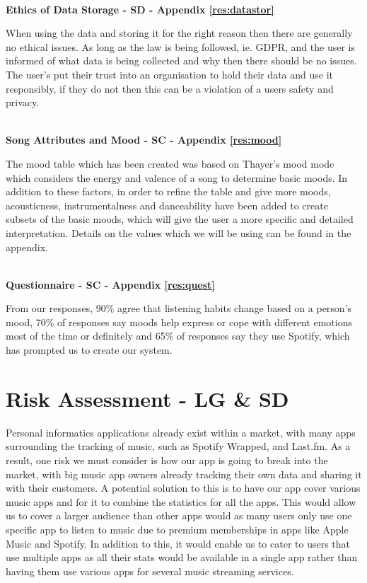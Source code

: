 \documentclass[10pt, notitlepage]{report}
\begin{document}
\leavevmode \\
\textbf{Ethics of Data Storage - SD - Appendix \ref{res:datastor}}

When using the data and storing it for the right reason then there are generally no ethical issues. As long as the law is being followed, ie. GDPR, and the user is informed of what data is being collected and why then there should be no issues. The user's put their trust into an organisation to hold their data and use it responsibly, if they do not then this can be a violation of a users safety and privacy.

\leavevmode \\
\textbf{Song Attributes and Mood - SC - Appendix \ref{res:mood}}

The mood table which has been created was based on Thayer’s mood mode which considers the energy and valence of a song to determine basic moods. In addition to these factors, in order to refine the table and give more moods, acousticness, instrumentalness and danceability have been added to create subsets of the basic moods, which will give the user a more specific and detailed interpretation. Details on the values which we will be using can be found in the appendix.

\leavevmode \\
\textbf{Questionnaire - SC - Appendix \ref{res:quest}}

From our responses, 90\% agree that listening habits change based on a person's mood, 70\% of responses say moods help express or cope with different emotions most of the time or definitely and 65\% of responses say they use Spotify, which has prompted us to create our system.


\chapter{Risk Assessment - LG \& SD}
Personal informatics applications already exist within a market, with many apps surrounding the tracking of music, such as Spotify Wrapped, and Last.fm. As a result, one risk we must consider is how our app is going to break into the market, with big music app owners already tracking their own data and sharing it with their customers. A potential solution to this is to have our app cover various music apps and for it to combine the statistics for all the apps. This would allow us to cover a larger audience than other apps would as many users only use one specific app to listen to music due to premium memberships in apps like Apple Music and Spotify. In addition to this, it would enable us to cater to users that use multiple apps as all their stats would be available in a single app rather than having them use various apps for several music streaming services.
\end{document}
